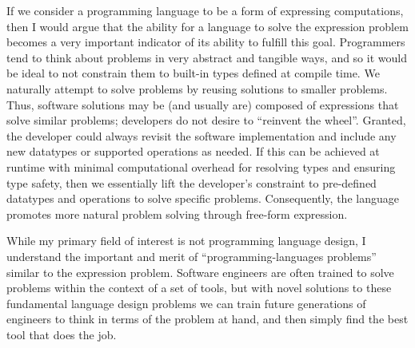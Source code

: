 \documentclass[12pt,letterpaper]{article}
\begin{document}
If we consider a programming language to be a form of expressing computations, then I would 
argue that the ability for a language
to solve the expression problem becomes a very important indicator of its ability to fulfill this goal. 
Programmers tend to think about problems in very abstract and tangible ways, and so it would be ideal
to not constrain them to built-in types defined at compile time. We naturally attempt to solve problems
by reusing solutions to smaller problems. Thus, software solutions may be (and usually are) 
composed of expressions that solve similar problems; developers do not desire to ``reinvent the wheel''.
Granted, the developer could always revisit the software implementation and include any new
datatypes or supported operations as needed. If this can be achieved at runtime with minimal computational
overhead for resolving types and ensuring type safety, then we essentially lift the developer's 
constraint to pre-defined datatypes and operations to solve specific problems. Consequently, 
the language promotes more natural problem solving through free-form expression. 

While my primary field of interest is not programming language design, I understand the important
and merit of ``programming-languages problems'' similar to the expression problem. Software engineers
are often trained to solve problems within the context of a set of tools, but with novel solutions
to these fundamental language design problems we can train future generations of engineers to
think in terms of the problem at hand, and then simply find the best tool that does the job. 



\end{document}
